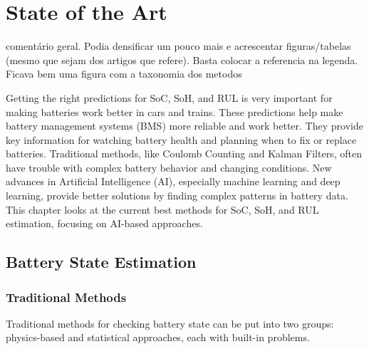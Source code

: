 \chapter{State of the Art}
\label{ch:stateoftheart}
\color{Red}comentário geral. Podia densificar um pouco mais e acrescentar figuras/tabelas (mesmo que sejam dos artigos que refere). Basta colocar a referencia na legenda. Ficava bem uma figura com a taxonomia  dos metodos\color{Black}

Getting the right predictions for SoC, SoH, and RUL is very important for making batteries work better in cars and trains. These predictions help make battery management systems (BMS) more reliable and work better. They provide key information for watching battery health and planning when to fix or replace batteries. Traditional methods, like Coulomb Counting and Kalman Filters, often have trouble with complex battery behavior and changing conditions. New advances in Artificial Intelligence (AI), especially machine learning and deep learning, provide better solutions by finding complex patterns in battery data. This chapter looks at the current best methods for SoC, SoH, and RUL estimation, focusing on AI-based approaches.

\section{Battery State Estimation}

\subsection{Traditional Methods}
\label{subsec:traditional_methods}
Traditional methods for checking battery state can be put into two groups: physics-based and statistical approaches, each with built-in problems.

